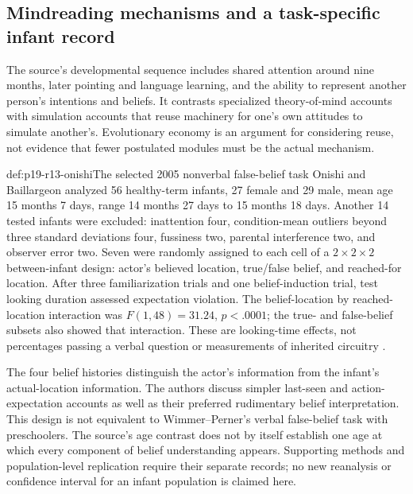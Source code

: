 \subsection{Mindreading mechanisms and a task-specific infant record}

The source's developmental sequence includes shared attention around nine
months, later pointing and language learning, and the ability to represent
another person's intentions and beliefs. It contrasts specialized
theory-of-mind accounts with simulation accounts that reuse machinery for
one's own attitudes to simulate another's. Evolutionary economy is an
argument for considering reuse, not evidence that fewer postulated modules
must be the actual mechanism.

\begin{hbdefinition}{def:p19-r13-onishi}{The selected 2005 nonverbal false-belief task}
Onishi and Baillargeon analyzed 56 healthy-term infants, 27 female and
29 male, mean age 15 months 7 days, range 14 months 27 days to
15 months 18 days. Another 14 tested infants were excluded: inattention
four, condition-mean outliers beyond three standard deviations four,
fussiness two, parental interference two, and observer error two.
Seven were randomly assigned to each cell of a \(2\times2\times2\)
between-infant design: actor's believed location, true/false belief,
and reached-for location. After three familiarization trials and one
belief-induction trial, test looking duration assessed expectation violation.
The belief-location by reached-location interaction was
\(F(1,48)=31.24\), \(p<.0001\); the true- and false-belief subsets also
showed that interaction. These are looking-time effects, not percentages
passing a verbal question or measurements of inherited circuitry
\cite[pp.~255--258]{R13OnishiBaillargeon2005}.
\end{hbdefinition}

The four belief histories distinguish the actor's information from the
infant's actual-location information. The authors discuss simpler last-seen
and action-expectation accounts as well as their preferred rudimentary
belief interpretation. This design is not equivalent to Wimmer--Perner's
verbal false-belief task with preschoolers. The source's age contrast does
not by itself establish one age at which every component of belief
understanding appears. Supporting methods and population-level replication
require their separate records; no new reanalysis or confidence interval
for an infant population is claimed here.

